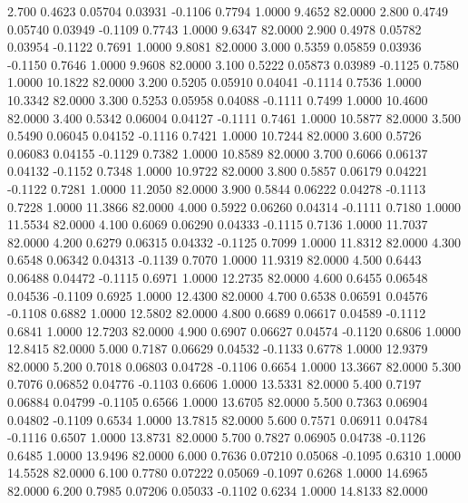    2.700   0.4623   0.05704   0.03931  -0.1106   0.7794   1.0000   9.4652  82.0000
   2.800   0.4749   0.05740   0.03949  -0.1109   0.7743   1.0000   9.6347  82.0000
   2.900   0.4978   0.05782   0.03954  -0.1122   0.7691   1.0000   9.8081  82.0000
   3.000   0.5359   0.05859   0.03936  -0.1150   0.7646   1.0000   9.9608  82.0000
   3.100   0.5222   0.05873   0.03989  -0.1125   0.7580   1.0000  10.1822  82.0000
   3.200   0.5205   0.05910   0.04041  -0.1114   0.7536   1.0000  10.3342  82.0000
   3.300   0.5253   0.05958   0.04088  -0.1111   0.7499   1.0000  10.4600  82.0000
   3.400   0.5342   0.06004   0.04127  -0.1111   0.7461   1.0000  10.5877  82.0000
   3.500   0.5490   0.06045   0.04152  -0.1116   0.7421   1.0000  10.7244  82.0000
   3.600   0.5726   0.06083   0.04155  -0.1129   0.7382   1.0000  10.8589  82.0000
   3.700   0.6066   0.06137   0.04132  -0.1152   0.7348   1.0000  10.9722  82.0000
   3.800   0.5857   0.06179   0.04221  -0.1122   0.7281   1.0000  11.2050  82.0000
   3.900   0.5844   0.06222   0.04278  -0.1113   0.7228   1.0000  11.3866  82.0000
   4.000   0.5922   0.06260   0.04314  -0.1111   0.7180   1.0000  11.5534  82.0000
   4.100   0.6069   0.06290   0.04333  -0.1115   0.7136   1.0000  11.7037  82.0000
   4.200   0.6279   0.06315   0.04332  -0.1125   0.7099   1.0000  11.8312  82.0000
   4.300   0.6548   0.06342   0.04313  -0.1139   0.7070   1.0000  11.9319  82.0000
   4.500   0.6443   0.06488   0.04472  -0.1115   0.6971   1.0000  12.2735  82.0000
   4.600   0.6455   0.06548   0.04536  -0.1109   0.6925   1.0000  12.4300  82.0000
   4.700   0.6538   0.06591   0.04576  -0.1108   0.6882   1.0000  12.5802  82.0000
   4.800   0.6689   0.06617   0.04589  -0.1112   0.6841   1.0000  12.7203  82.0000
   4.900   0.6907   0.06627   0.04574  -0.1120   0.6806   1.0000  12.8415  82.0000
   5.000   0.7187   0.06629   0.04532  -0.1133   0.6778   1.0000  12.9379  82.0000
   5.200   0.7018   0.06803   0.04728  -0.1106   0.6654   1.0000  13.3667  82.0000
   5.300   0.7076   0.06852   0.04776  -0.1103   0.6606   1.0000  13.5331  82.0000
   5.400   0.7197   0.06884   0.04799  -0.1105   0.6566   1.0000  13.6705  82.0000
   5.500   0.7363   0.06904   0.04802  -0.1109   0.6534   1.0000  13.7815  82.0000
   5.600   0.7571   0.06911   0.04784  -0.1116   0.6507   1.0000  13.8731  82.0000
   5.700   0.7827   0.06905   0.04738  -0.1126   0.6485   1.0000  13.9496  82.0000
   6.000   0.7636   0.07210   0.05068  -0.1095   0.6310   1.0000  14.5528  82.0000
   6.100   0.7780   0.07222   0.05069  -0.1097   0.6268   1.0000  14.6965  82.0000
   6.200   0.7985   0.07206   0.05033  -0.1102   0.6234   1.0000  14.8133  82.0000

